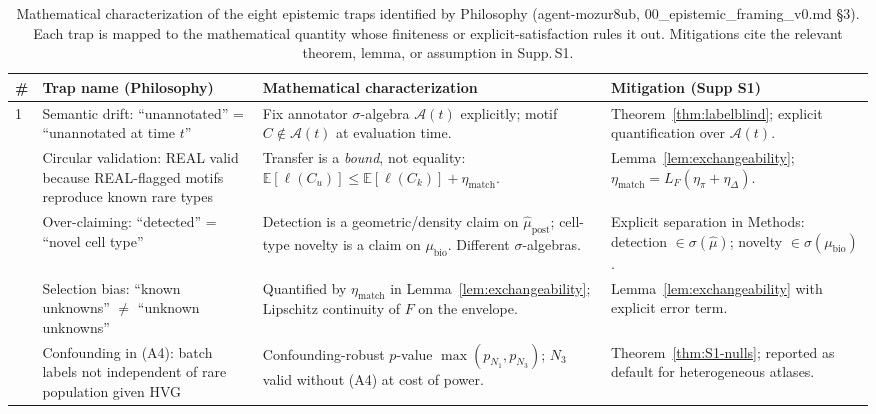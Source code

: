 
\begin{table}[h]
\centering
\caption{Mathematical characterization of the eight epistemic traps identified by Philosophy (agent-mozur8ub, 00\_epistemic\_framing\_v0.md \S3). Each trap is mapped to the mathematical quantity whose finiteness or explicit-satisfaction rules it out. Mitigations cite the relevant theorem, lemma, or assumption in Supp.\,S1.}
\label{tab:epistemic-traps}
\small
\renewcommand{\arraystretch}{1.25}
\begin{tabular}{p{0.6cm} p{3.6cm} p{4.7cm} p{4.0cm}}
\toprule
\textbf{\#} & \textbf{Trap name (Philosophy)} & \textbf{Mathematical characterization} & \textbf{Mitigation (Supp S1)} \\
\midrule
1 & Semantic drift: ``unannotated'' = ``unannotated at time $t$'' & Fix annotator $\sigma$-algebra $\mathcal{A}(t)$ explicitly; motif $C \notin \mathcal{A}(t)$ at evaluation time. & Theorem~\ref{thm:labelblind}; explicit quantification over $\mathcal{A}(t)$. \\
\addlinespace[2pt]
2 & Circular validation: REAL valid because REAL-flagged motifs reproduce known rare types & Transfer is a \emph{bound}, not equality: $\mathbb{E}[\ell(C_u)] \leq \mathbb{E}[\ell(C_k)] + \eta_{\text{match}}$. & Lemma~\ref{lem:exchangeability}; $\eta_{\text{match}} = L_F(\eta_\pi + \eta_\Delta)$. \\
\addlinespace[2pt]
3 & Over-claiming: ``detected'' = ``novel cell type'' & Detection is a geometric/density claim on $\hat\mu_{\text{post}}$; cell-type novelty is a claim on $\mu_{\text{bio}}$. Different $\sigma$-algebras. & Explicit separation in Methods: detection $\in \sigma(\hat\mu)$; novelty $\in \sigma(\mu_{\text{bio}})$. \\
\addlinespace[2pt]
4 & Selection bias: ``known unknowns'' $\neq$ ``unknown unknowns'' & Quantified by $\eta_{\text{match}}$ in Lemma~\ref{lem:exchangeability}; Lipschitz continuity of $F$ on the envelope. & Lemma~\ref{lem:exchangeability} with explicit error term. \\
\addlinespace[2pt]
5 & Confounding in (A4): batch labels not independent of rare population given HVG & Confounding-robust $p$-value $\max(p_{N_1}, p_{N_3})$; $N_3$ valid without (A4) at cost of power. & Theorem~\ref{thm:S1-nulls}; reported as default for heterogeneous atlases. \\

\end{tabular}
\end{table}
